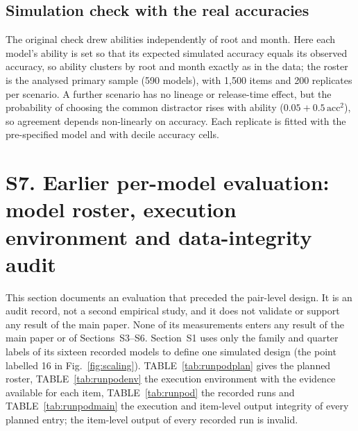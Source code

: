 \documentclass[10pt]{article}
\begin{document}
\subsection*{Simulation check with the real accuracies}
The original check drew abilities independently of root and month. Here each model's ability is set so that its expected simulated accuracy equals its observed accuracy, so ability clusters by root and month exactly as in the data; the roster is the analysed primary sample (590 models), with 1{,}500 items and 200 replicates per scenario. A further scenario has no lineage or release-time effect, but the probability of choosing the common distractor rises with ability ($0.05 + 0.5\,\mathrm{acc}^2$), so agreement depends non-linearly on accuracy. Each replicate is fitted with the pre-specified model and with decile accuracy cells.

\begin{table}[H]
\caption{\textbf{Rejection rates (\%) with real accuracies} (Wilson 95\% intervals; model-level dyadic SEs; nominal 5\%).}
\label{tab:simreal}
\centering
\footnotesize
\setlength{\tabcolsep}{2.5pt}
\end{table}

\section*{S7. Earlier per-model evaluation: model roster, execution environment and data-integrity audit}
This section documents an evaluation that preceded the pair-level design. It is an audit record, not a second empirical study, and it does not validate or support any result of the main paper. None of its measurements enters any result of the main paper or of Sections~S3--S6. Section~S1 uses only the family and quarter labels of its sixteen recorded models to define one simulated design (the point labelled 16 in Fig.~\ref{fig:scaling}). TABLE~\ref{tab:runpodplan} gives the planned roster, TABLE~\ref{tab:runpodenv} the execution environment with the evidence available for each item, TABLE~\ref{tab:runpod} the recorded runs and TABLE~\ref{tab:runpodmain} the execution and item-level output integrity of every planned entry; the item-level output of every recorded run is invalid.
\end{document}
